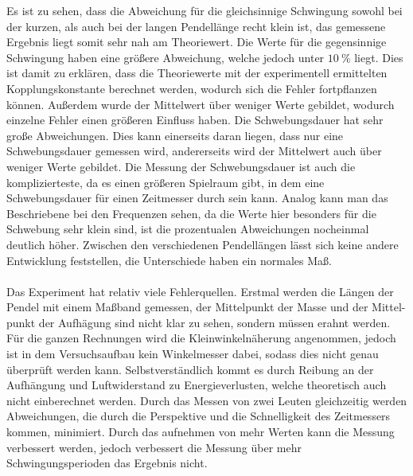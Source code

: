 \noindent Es ist zu sehen, dass die Abweichung für die gleichsinnige Schwingung sowohl bei der kurzen, als auch bei der langen Pendellänge recht klein ist, das
gemessene Ergebnis liegt somit sehr nah am Theoriewert. Die Werte für die gegensinnige Schwingung haben eine größere Abweichung, welche jedoch unter $\SI{10}{\percent}$
liegt. Dies ist damit zu erklären, dass die Theoriewerte mit der experimentell ermittelten Kopplungskonstante berechnet werden, wodurch sich die Fehler fortpflanzen 
können. Außerdem wurde der Mittelwert über weniger Werte gebildet, wodurch einzelne Fehler einen größeren Einfluss haben.
Die Schwebungsdauer hat sehr große Abweichungen. Dies kann einerseits daran liegen, dass nur eine Schwebungsdauer gemessen wird, andererseits wird der Mittelwert
auch über weniger Werte gebildet. Die Messung der Schwebungsdauer ist auch die komplizierteste, da es einen größeren Spielraum gibt, in dem eine Schwebungsdauer
für einen Zeitmesser durch sein kann.  
Analog kann man das Beschriebene bei den Frequenzen sehen, da die Werte hier besonders für die Schwebung sehr klein sind, ist die
prozentualen Abweichungen nocheinmal deutlich höher. Zwischen den verschiedenen Pendellängen lässt sich keine andere Entwicklung feststellen, die Unterschiede haben
ein normales Maß. \\ \\

\noindent Das Experiment hat relativ viele Fehlerquellen. Erstmal werden die Längen der Pendel mit einem Maßband gemessen, der Mittelpunkt der Masse und der Mittel-
punkt der Aufhägung sind nicht klar zu sehen, sondern müssen erahnt werden. Für die ganzen Rechnungen wird die Kleinwinkelnäherung angenommen, jedoch ist in dem 
Versuchsaufbau kein Winkelmesser dabei, sodass dies nicht genau überprüft werden kann. Selbstverständlich kommt es durch Reibung an der Aufhängung und 
Luftwiderstand zu Energieverlusten, welche theoretisch auch nicht einberechnet werden. Durch das Messen von zwei Leuten gleichzeitig werden Abweichungen, die durch
die Perspektive und die Schnelligkeit des Zeitmessers kommen, minimiert. Durch das aufnehmen von mehr Werten kann die Messung verbessert werden, jedoch verbessert
die Messung über mehr Schwingungsperioden das Ergebnis nicht. 